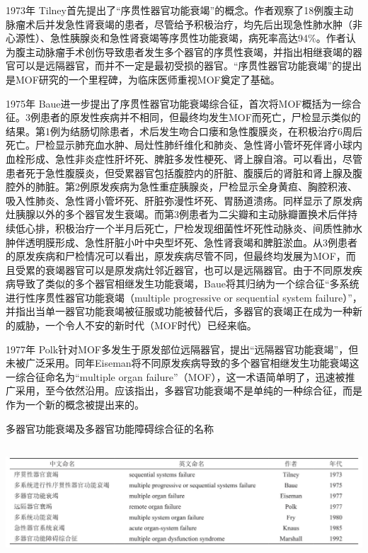 1973年
Tilney首先提出了“序贯性器官功能衰竭”的概念。作者观察了18例腹主动脉瘤术后并发急性肾衰竭的患者，尽管给予积极治疗，均先后出现急性肺水肿（非心源性）、急性胰腺炎和急性肾衰竭等序贯性功能衰竭，病死率高达94\%。作者认为腹主动脉瘤手术创伤导致患者发生多个器官的序贯性衰竭，并指出相继衰竭的器官可以是远隔器官，而并不一定是最初受损的器官。“序贯性器官功能衰竭”的提出是MOF研究的一个里程碑，为临床医师重视MOF奠定了基础。

1975年
Baue进一步提出了序贯性器官功能衰竭综合征，首次将MOF概括为一综合征。3例患者的原发性疾病并不相同，但最终均发生MOF而死亡，尸检显示类似的结果。第1例为结肠切除患者，术后发生吻合口瘘和急性腹膜炎，在积极治疗6周后死亡。尸检显示肺充血水肿、局灶性肺纤维化和肺炎、急性肾小管坏死伴肾小球内血栓形成、急性非炎症性肝坏死、脾脏多发性梗死、肾上腺自溶。可以看出，尽管患者死于急性腹膜炎，但受累器官包括腹腔内的肝脏、腹膜后的肾脏和肾上腺及腹腔外的肺脏。第2例原发疾病为急性重症胰腺炎，尸检显示全身黄疸、胸腔积液、吸入性肺炎、急性肾小管坏死、肝脏弥漫性坏死、胃肠道溃疡。同样显示了原发病灶胰腺以外的多个器官发生衰竭。而第3例患者为二尖瓣和主动脉瓣置换术后伴持续低心排，积极治疗一个半月后死亡，尸检发现细菌性坏死性动脉炎、间质性肺水肿伴透明膜形成、急性肝脏小叶中央型坏死、急性肾衰竭和脾脏淤血。从3例患者的原发疾病和尸检情况可以看出，原发疾病尽管不同，但最终均发展为MOF，而且受累的衰竭器官可以是原发病灶邻近器官，也可以是远隔器官。由于不同原发疾病导致了类似的多个器官相继发生功能衰竭，Baue将其归纳为一个综合征“多系统进行性序贯性器官功能衰竭（multiple
progressive or sequential system
failure）”，并指出当单一器官功能衰竭被征服或功能被替代后，多器官的衰竭正在成为一种新的威胁，一个令人不安的新时代（MOF时代）已经来临。

1977年
Polk针对MOF多发生于原发部位远隔器官，提出“远隔器官功能衰竭”，但未被广泛采用。同年Eiseman将不同原发疾病导致的多个器官相继发生功能衰竭这一综合征命名为“multiple
organ
failure”（MOF），这一术语简单明了，迅速被推广采用，至今依然沿用。应该指出，多器官功能衰竭不是单纯的一种综合征，而是作为一个新的概念被提出来的。

\begin{table}[htbp]
\centering
\caption{多器官功能衰竭及多器官功能障碍综合征的名称}
\label{tab35-2}
\includegraphics[width=6.60417in,height=1.66667in]{./images/Image00131.jpg}
\end{table}

